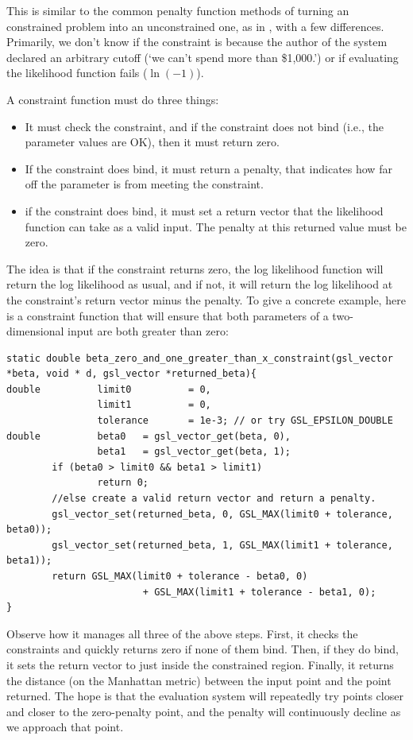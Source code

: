 This is similar to the common penalty function methods of turning an
constrained problem into an unconstrained one, as in \cite{avriel:nonlinear},
with a few differences. Primarily, we don't know if the constraint is
because the author of the system declared an arbitrary cutoff (`we can't spend more
than \$1,000.') or if evaluating the likelihood function fails
($\ln(-1)$). 

A constraint function must do three things:
\begin{itemize}
\item It must check the constraint, and if the constraint does not bind (i.e., the parameter values are OK), then it must return zero.
\item If the constraint does bind, it must return a penalty, that indicates how far off the parameter is from meeting the constraint.
\item if the constraint does bind, it must set a return vector that the likelihood function can take as a valid input. The penalty at this returned value must be zero.
\end{itemize}

The idea is that if the constraint returns zero, the log likelihood
function will return the log likelihood as usual, and if not, it will
return the log likelihood at the constraint's return vector minus the
penalty. To give a concrete example, here is a constraint function that
will ensure that both parameters of a two-dimensional input are both
greater than zero:

\begin{lstlisting}
static double beta_zero_and_one_greater_than_x_constraint(gsl_vector *beta, void * d, gsl_vector *returned_beta){
double          limit0          = 0,
                limit1          = 0,
                tolerance       = 1e-3; // or try GSL_EPSILON_DOUBLE
double          beta0   = gsl_vector_get(beta, 0),
                beta1   = gsl_vector_get(beta, 1);
        if (beta0 > limit0 && beta1 > limit1)
                return 0;
        //else create a valid return vector and return a penalty.
        gsl_vector_set(returned_beta, 0, GSL_MAX(limit0 + tolerance, beta0)); 
        gsl_vector_set(returned_beta, 1, GSL_MAX(limit1 + tolerance, beta1));
        return GSL_MAX(limit0 + tolerance - beta0, 0) 
                        + GSL_MAX(limit1 + tolerance - beta1, 0); 
}
\end{lstlisting}

Observe how it manages all three of the above steps. First, it checks
the constraints and quickly returns zero if none of them bind. Then, if
they do bind, it sets the return vector to just inside the constrained
region. Finally, it returns the distance (on the Manhattan metric)
between the input point and the point returned. The hope is that the
evaluation system will repeatedly try points closer and closer to the
zero-penalty point, and the penalty will continuously decline as we
approach that point.

